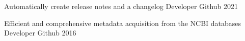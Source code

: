 
\begin{cvhonors}


    \cvhonor
        {Automatically create release notes and a changelog} %
        {Developer} %
        {Github} %
        {2021} %

    \cvhonor
        {Efficient and comprehensive metadata acquisition from the NCBI databases} %
        {Developer} %
        {Github} %
        {2016} %

\end{cvhonors}


